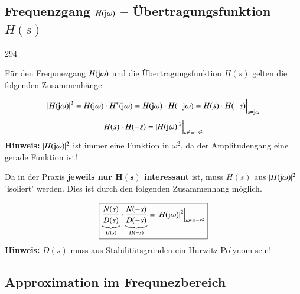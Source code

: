

\subsection[Frequenzgang H(jimg omega) -- Übertragungsfunktion H(s)]{Frequenzgang $H(\mathrm{j} \omega)$ -- Übertragungsfunktion $H(s)$}{294}

Für den Frequnezgang $H(\mathrm{j} \omega)$ und die Übertragungsfunktion $H(s)$ gelten die folgenden Zusammenhänge

$$ | H(\mathrm{j} \omega) |^2 = H(\mathrm{j} \omega) \cdot H^*(\mathrm{j} \omega) = H(\mathrm{j} \omega) \cdot H(- \mathrm{j} \omega) = H(s) \cdot H(-s) \Big|_{s = \mathrm{j} \omega} $$
$$ H(s) \cdot H(-s) = | H(\mathrm{j} \omega) |^2 \Big|_{\omega^2 = -s^2} $$
\textbf{Hinweis:} $| H(\mathrm{j} \omega) |^2$ ist immer eine Funktion in $\omega^2$, da der Amplitudengang eine gerade Funktion ist!

\vspace{0.2cm}

Da in der Praxis \textbf{jeweils nur $\bm{H(s)}$ interessant} ist, muss $H(s)$ aus $| H(\mathrm{j} \omega) |^2$ 'isoliert' werden. 
Dies ist durch den folgenden Zusammenhang möglich.

$$ \boxed{ \underbrace{ \frac{N(s)}{D(s)} }_{H(s)} \cdot  \underbrace{ \frac{N(-s)}{D(-s)} }_{H(-s)} = | H(\mathrm{j} \omega) |^2 \Big|_{\omega^2 = -s^2} } $$
\textbf{Hinweis:} $D(s)$ muss aus Stabilitätsgründen ein Hurwitz-Polynom sein!


\subsection{Approximation im Frequnezbereich}

